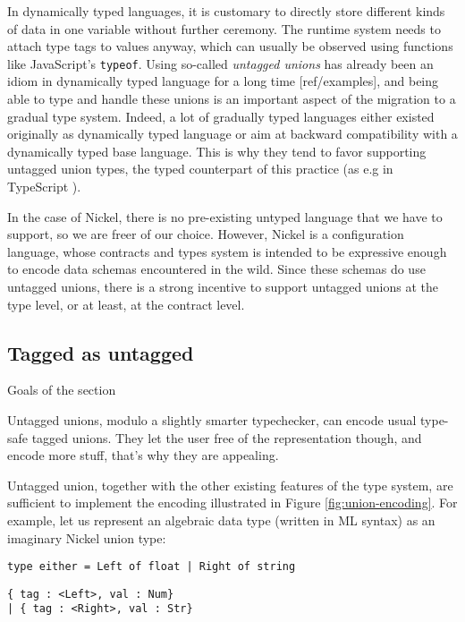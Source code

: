 \documentclass[sigplan,10pt,review,anonymous]{acmart}
\newcommand{\unsure}[2][1=]{}
\begin{document}
In dynamically typed languages, it is customary to directly store different kinds
of data in one variable without further ceremony. The runtime system needs to
attach type tags to values anyway, which can usually be observed using functions
like JavaScript's \verb+typeof+. Using so-called \emph{untagged
  unions}\unsure{If you can observe with typeof, then it's
  pretty much a tagged union, though the tag is implicit} has
already been an idiom in dynamically typed language for a long time
[ref/examples], and being able to type and handle these unions is an important
aspect of the migration to a gradual type system. Indeed, a lot of gradually
typed languages either existed originally as dynamically typed language or aim
at backward compatibility with a dynamically typed base language. This is why
they tend to favor supporting untagged union types, the typed counterpart of
this practice (as e.g in TypeScript \cite{TypeScriptUnions}).

In the case of Nickel, there is no pre-existing untyped language that we have to
support, so we are freer of our choice. However, Nickel is a configuration
language, whose contracts and types system is intended to be expressive enough
to encode data schemas encountered in the wild. Since these schemas do use
untagged unions, there is a strong incentive to support untagged unions at the
type level, or at least, at the contract level.

\subsection{Tagged as untagged}
{\color{red}Goals of the section

Untagged unions, modulo a slightly smarter typechecker, can encode usual type-safe
tagged unions. They let the user free of the representation though, and encode
more stuff, that's why they are appealing.\vspace{0.5cm}}

Untagged union, together with the other existing features of the type system,
are sufficient to implement the encoding illustrated in Figure
\ref{fig:union-encoding}. For example, let us represent an algebraic data type
(written in ML syntax) as an imaginary Nickel union type:

\begin{lstlisting}[language=caml]
type either = Left of float | Right of string
\end{lstlisting}

\begin{lstlisting}[language=nickel]
{ tag : <Left>, val : Num}
| { tag : <Right>, val : Str}
\end{lstlisting}
\end{document}
